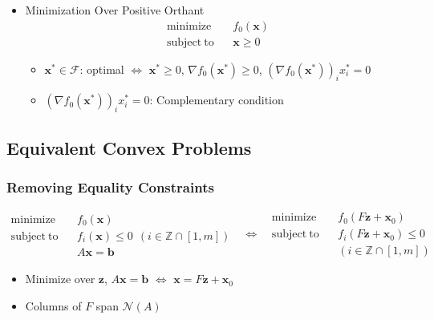 \begin{itemize}
    \item Minimization Over Positive Orthant
    \begin{equation}\begin{aligned}
        \mathrm{minimize}~~&~~f_0(\mathbf{x}) \\
        \mathrm{subject~to}~~&~~\mathbf{x} \geq 0
    \end{aligned}\end{equation}
    \begin{itemize}
        \item $\mathbf{x}^{\ast} \in \mathcal{F}$: optimal $\Leftrightarrow$ $\mathbf{x}^{\ast} \geq 0$,
            $\nabla f_0 \left(\mathbf{x}^{\ast}\right) \geq 0$, $\left(\nabla f_0\left(\mathbf{x}^{\ast}\right)\right)_i x_i^{\ast} = 0$
        \item $\left(\nabla f_0\left(\mathbf{x}^{\ast}\right)\right)_i x_i^{\ast} = 0$: Complementary condition
    \end{itemize}
\end{itemize}
\newpage

\subsection{Equivalent Convex Problems}

\subsubsection*{Removing Equality Constraints}
\begin{equation}\begin{aligned}
    \mathrm{minimize}~~&~~f_0(\mathbf{x}) \\
    \mathrm{subject~to}~~&~~f_i(\mathbf{x}) \leq 0~~(i \in \mathbb{Z} \cap [1,m])\\
        &~~A\mathbf{x} = \mathbf{b}
\end{aligned}~~~\Leftrightarrow~~~\begin{aligned}
    \mathrm{minimize}~~&~~f_0(F\mathbf{z} + \mathbf{x}_0) \\
    \mathrm{subject~to}~~&~~f_i(F\mathbf{z} + \mathbf{x}_0) \leq 0\\
        &~~(i \in \mathbb{Z} \cap [1,m])
\end{aligned}\end{equation}
\begin{itemize}
    \item Minimize over $\mathbf{z}$, $A\mathbf{x} = \mathbf{b}$ $\Leftrightarrow$ $\mathbf{x} = F\mathbf{z} + \mathbf{x}_0$
    \item Columns of $F$ span $\mathcal{N}(A)$
\end{itemize}

